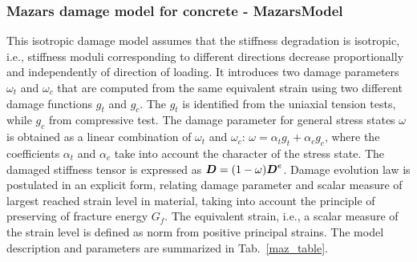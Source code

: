 \documentclass[a4paper]{article}
\newcommand{\mbf}[1]{\mbox{\boldmath$#1$}}
\begin{document}
\subsubsection{Mazars damage model for concrete - MazarsModel}
This isotropic damage model assumes that the stiffness degradation is
isotropic, i.e., stiffness moduli corresponding to different
directions decrease proportionally and independently of direction of
loading.
It introduces two damage parameters $\omega_t$ and $\omega_c$ that
are computed from the same equivalent strain using two different damage functions
$g_t$ and $g_c$. The $g_t$ is identified from the uniaxial tension tests, while
$g_c$ from compressive test. The damage parameter for general stress states
$\omega$ is obtained as a linear combination of $\omega_t$ and $\omega_c$:
$\omega=\alpha_t g_t + \alpha_c g_c$, where the coefficients
$\alpha_t$ and $\alpha_c$ take into account the character of the
stress state.
The damaged stiffness tensor is expressed as
$\mbf{D}=(1-\omega)\mbf{D}^e$.
Damage evolution law is postulated in an explicit form, relating
damage parameter and scalar measure of largest reached strain level in
material, taking into account the principle of preserving of fracture
energy $G_f$. The equivalent strain, i.e., a scalar measure of the
strain level is defined as norm from positive principal strains.
The model description and parameters are summarized
in Tab.~\ref{maz_table}.
\end{document}
